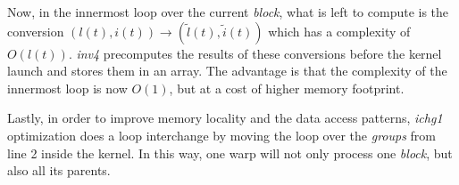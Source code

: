Now, in the innermost loop over the current \textit{block}, what is left to
compute is the conversion $(l(t), i(t)) \rightarrow (\tilde{l}(t),
\tilde{i}(t))$ which has a complexity of $O(l(t))$. \textit{inv4} precomputes
the results of these conversions before the kernel launch and stores them in an
array. The advantage is that the complexity of the innermost loop is now $O(1)$,
but at a cost of higher memory footprint.

Lastly, in order to improve memory locality and the data access patterns,
\textit{ichg1} optimization does a loop interchange by moving the loop over the
\textit{groups} from line 2 inside the kernel. In this way, one warp will not
only process one \textit{block}, but also all its parents.

% 
% 
